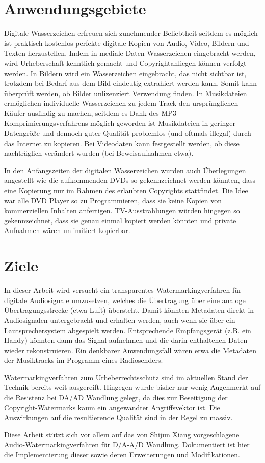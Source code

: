 \section{Anwendungsgebiete}

Digitale Wasserzeichen erfreuen sich zunehmender Beliebtheit seitdem es möglich ist praktisch kostenlos perfekte digitale Kopien von Audio, Video, Bildern und Texten herzustellen\cite{mintzer1997effective}. Indem in mediale Daten Wasserzeichen eingebracht werden, wird Urheberschaft kenntlich gemacht und Copyrightanliegen können verfolgt werden. In Bildern wird ein Wasserzeichen eingebracht, das nicht sichtbar ist, trotzdem bei Bedarf aus dem Bild eindeutig extrahiert werden kann. Somit kann überprüft werden, ob Bilder unlizenziert Verwendung finden. In Musikdateien ermöglichen individuelle Wasserzeichen zu jedem Track den ursprünglichen Käufer ausfindig zu machen, seitdem es Dank des MP3-Komprimierungsverfahrens möglich geworden ist Musikdateien in geringer Datengröße und dennoch guter Qualität problemlos (und oftmals illegal) durch das Internet zu kopieren. Bei Videodaten kann festgestellt werden, ob diese nachträglich verändert wurden (bei Beweisaufnahmen etwa). 

In den Anfangszeiten der digitalen Wasserzeichen wurden auch Überlegungen angestellt wie die aufkommenden DVDs so gekennzeichnet werden könnten, dass eine Kopierung nur im Rahmen des erlaubten Copyrights stattfindet\cite{petitcolas1999information}. Die Idee war alle DVD Player so zu Programmieren, dass sie keine Kopien von kommerziellen Inhalten anfertigen. TV-Ausstrahlungen würden hingegen so gekennzeichnet, dass sie genau einmal kopiert werden könnten und private Aufnahmen wären unlimitiert kopierbar. 

\section{Ziele}

In dieser Arbeit wird versucht ein transparentes Watermarkingverfahren für digitale Audiosignale umzusetzen, welches die Übertragung über eine analoge Übertragungsstrecke (etwa Luft) übersteht. Damit könnten Metadaten direkt in Audiosignalen untergebracht und erhalten werden, auch wenn sie über ein Lautsprechersystem abgespielt werden. Entsprechende Empfangsgerät (z.B. ein Handy) könnten dann das Signal aufnehmen und die darin enthaltenen Daten wieder rekonstruieren. Ein denkbarer Anwendungsfall wären etwa die Metadaten der Musiktracks im Programm eines Radiosenders.

Watermarkingverfahren zum Urheberrechtsschutz sind im aktuellen Stand der Technik bereits weit ausgereift. Hingegen wurde bisher nur wenig Augenmerkt auf die Resistenz bei DA/AD Wandlung gelegt, da dies zur Beseitigung der Copyright-Watermarks kaum ein angewandter Angriffsvektor ist. Die Auswirkungen auf die resultierende Qualität sind in der Regel zu massiv. 

Diese Arbeit stützt sich vor allem auf das von Shijun Xiang\cite{xiang2007robust} vorgeschlagene Audio-Watermarkingverfahren für D/A-A/D Wandlung. Dokumentiert ist hier die Implementierung dieser sowie deren Erweiterungen und Modifikationen. 


